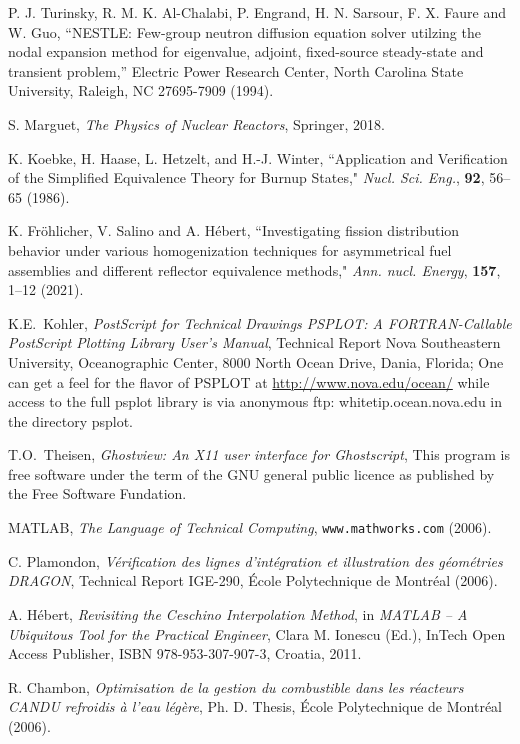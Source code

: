 \begin{thebibliography}{99}
P. J. Turinsky, R. M. K. Al-Chalabi, P. Engrand, H. N. Sarsour, F. X. Faure and  W. Guo, ``NESTLE: Few-group neutron diffusion equation solver utilzing the nodal expansion
method for eigenvalue, adjoint, fixed-source steady-state and transient problem,'' Electric Power Research Center, North Carolina State University, Raleigh, NC 27695-7909 (1994).

S. Marguet, {\sl The Physics of Nuclear Reactors}, Springer, 2018.

K. Koebke, H. Haase, L. Hetzelt, and H.-J. Winter, ``Application and Verification of the Simplified Equivalence Theory
for Burnup States," {\sl Nucl. Sci. Eng.}, {\bf 92}, 56--65 (1986).

K. Fr\"{o}hlicher, V. Salino and A. H\'ebert, ``Investigating fission distribution behavior under various
homogenization techniques for asymmetrical fuel assemblies and different reflector equivalence methods,"
{\sl Ann. nucl. Energy}, {\bf 157}, 1--12 (2021).

K.E.~Kohler, 
\textsl{PostScript for Technical Drawings PSPLOT: A FORTRAN-Callable PostScript Plotting
Library User's Manual}, 
Technical Report Nova Southeastern University, Oceanographic
Center, 8000 North Ocean Drive, Dania, Florida; One can get a feel for the flavor of
PSPLOT at \url{http://www.nova.edu/ocean/} while access to the full psplot library is via
anonymous ftp: whitetip.ocean.nova.edu in the directory psplot. 

T.O.~Theisen, 
\textsl{Ghostview: An X11 user interface for Ghostscript}, 
This program is free software under the term of the GNU general public licence as
published by the Free Software Fundation.

MATLAB, {\sl The Language of Technical Computing}, {\tt www.mathworks.com} (2006). 

C. Plamondon, {\sl V\'erification des lignes d'int\'egration et illustration des g\'eom\'etries DRAGON}, Technical Report 
IGE-290, \'Ecole Polytechnique de Montr\'eal (2006). 

A. H\'ebert, {\sl Revisiting the Ceschino Interpolation Method}, in {\sl MATLAB -- A Ubiquitous Tool for the Practical
Engineer}, Clara M. Ionescu (Ed.), InTech Open Access Publisher, ISBN 978-953-307-907-3, Croatia, 2011.

R. Chambon, {\sl Optimisation de la gestion du combustible dans les r\'eacteurs
CANDU refroidis \`a l'eau l\'eg\`ere}, Ph. D. Thesis, \'Ecole Polytechnique de Montr\'eal (2006). 


\end{thebibliography}
